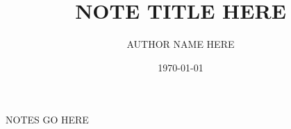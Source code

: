 \documentclass[12pt]{article}
\title{NOTE TITLE HERE}
\author{AUTHOR NAME HERE}
\date{\today}
\begin{document}
\maketitle
\newpage

NOTES GO HERE
\end{document}
